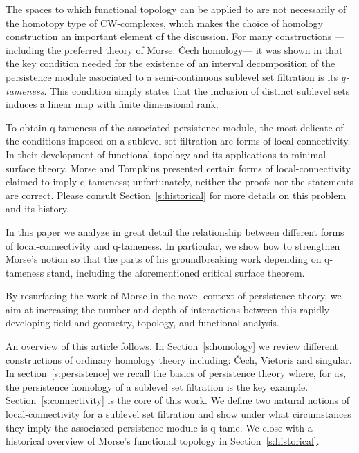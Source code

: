 The spaces to which functional topology can be applied to are not necessarily of the homotopy type of CW-complexes, which makes the choice of homology construction an important element of the discussion.
For many constructions ---including the preferred theory of Morse: \v{C}ech homology--- it was shown in \cite{schmahl2020structure} that the key condition needed for the existence of an interval decomposition of the persistence module associated to a semi-continuous sublevel set filtration is its \textit{q-tameness}.
This condition simply states that the inclusion of distinct sublevel sets induces a linear map with finite dimensional rank.

To obtain q-tameness of the associated persistence module, the most delicate of the conditions imposed on a sublevel set filtration are forms of local-connectivity.
In their development of functional topology and its applications to minimal surface theory, Morse and Tompkins presented certain forms of local-connectivity claimed to imply q-tameness; unfortunately, neither the proofs nor the statements are correct.
Please consult Section~\ref{s:historical} for more details on this problem and its history.

In this paper we analyze in great detail the relationship between different forms of local-connectivity and q-tameness.
In particular, we show how to strengthen Morse's notion so that the parts of his groundbreaking work depending on q-tameness stand, including the aforementioned critical surface theorem.

By resurfacing the work of Morse in the novel context of persistence theory, we aim at increasing the number and depth of interactions between this rapidly developing field and geometry, topology, and functional analysis.

An overview of this article follows.
In Section~\ref{s:homology} we review different constructions of ordinary homology theory including: \v{C}ech, Vietoris and singular.
In section~\ref{s:persistence} we recall the basics of persistence theory where, for us, the persistence homology of a sublevel set filtration is the key example.
Section~\ref{s:connectivity} is the core of this work.
We define two natural notions of local-connectivity for a sublevel set filtration and show under what circumstances they imply the associated persistence module is q-tame.
We close with a historical overview of Morse's functional topology in Section~\ref{s:historical}.